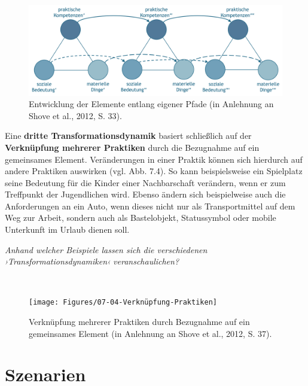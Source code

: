 \documentclass[
  a4paper,
]{book}
\begin{document}
\begin{figure}

{\centering \includegraphics{Figures/07-03-Entwicklung-Elemente} 

}

\caption{Entwicklung der Elemente entlang eigener Pfade (in Anlehnung an Shove et al., 2012, S. 33).}\label{fig:fig6}
\end{figure}

Eine \textbf{dritte Transformationsdynamik} basiert schließlich auf der \textbf{Verknüpfung mehrerer Praktiken} durch die Bezugnahme auf ein gemeinsames Element. Veränderungen in einer Praktik können sich hierdurch auf andere Praktiken auswirken (vgl. {Abb. 7.4}). So kann beispielsweise ein Spielplatz seine Bedeutung für die Kinder einer Nachbarschaft verändern, wenn er zum Treffpunkt der Jugendlichen wird. Ebenso ändern sich beispielweise auch die Anforderungen an ein Auto, wenn dieses nicht nur als Transportmittel auf dem Weg zur Arbeit, sondern auch als Bastelobjekt, Statussymbol oder mobile Unterkunft im Urlaub dienen soll.

\begin{blackbox}
\emph{Anhand welcher Beispiele lassen sich die verschiedenen ›Transformationsdynamiken‹ veranschaulichen?}

\end{blackbox}

~

\begin{figure}

{\centering \texttt{[image: Figures/07-04-Verknüpfung-Praktiken]} 

}

\caption{Verknüpfung mehrerer Praktiken durch Bezugnahme auf ein gemeinsames Element (in Anlehnung an Shove et al., 2012, S. 37).}\label{fig:fig7}
\end{figure}

\section{Szenarien}\label{szenarien}
\end{document}
